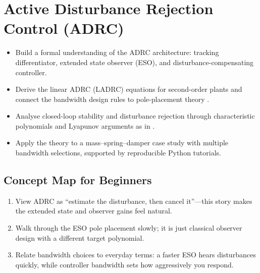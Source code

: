 \chapter{Active Disturbance Rejection Control (ADRC)}
\label{chap:adrc}

\begin{learningobjective}
\begin{itemize}[leftmargin=*]
    \item Build a formal understanding of the ADRC architecture: tracking differentiator, extended state observer (ESO), and disturbance-compensating controller.
    \item Derive the linear ADRC (LADRC) equations for second-order plants and connect the bandwidth design rules to pole-placement theory \parencite{gao2006active}.
    \item Analyse closed-loop stability and disturbance rejection through characteristic polynomials and Lyapunov arguments as in \textcite{han2009auto}.
    \item Apply the theory to a mass--spring--damper case study with multiple bandwidth selections, supported by reproducible Python tutorials.
\end{itemize}
\end{learningobjective}

\section{Concept Map for Beginners}
\begin{conceptroadmap}
\begin{enumerate}[leftmargin=*]
    \item View ADRC as ``estimate the disturbance, then cancel it''—this story makes the extended state and observer gains feel natural.
    \item Walk through the ESO pole placement slowly; it is just classical observer design with a different target polynomial.
    \item Relate bandwidth choices to everyday terms: a faster ESO hears disturbances quickly, while controller bandwidth sets how aggressively you respond.
\end{enumerate}
\end{conceptroadmap}

